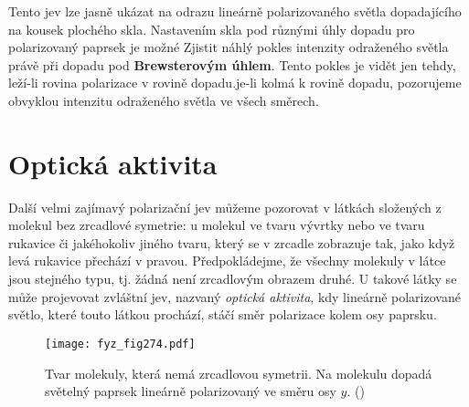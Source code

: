     Tento jev lze jasně ukázat na odrazu lineárně polarizovaného světla dopadajícího na kousek
    plochého skla. Nastavením skla pod různými úhly dopadu pro polarizovaný paprsek je možné Zjistit
    náhlý pokles intenzity odraženého světla právě při dopadu pod \textbf{Brewsterovým úhlem}. Tento
    pokles je vidět jen tehdy, leží-li rovina polarizace v rovině dopadu.je-li kolmá k rovině
    dopadu, pozorujeme obvyklou intenzitu odraženého světla ve všech směrech.

  \section{Optická aktivita}\label{fyz:IchapXXXIIIsecV}
    Další velmi zajímavý polarizační jev můžeme pozorovat v látkách složených z molekul bez
    zrcadlové symetrie: u molekul ve tvaru vývrtky nebo ve tvaru rukavice či jakéhokoliv jiného
    tvaru, který se v zrcadle zobrazuje tak, jako když levá rukavice přechází v pravou.
    Předpokládejme, že všechny molekuly v látce jsou stejného typu, tj. žádná není zrcadlovým
    obrazem druhé. U takové látky se může projevovat zvláštní jev, nazvaný \emph{optická aktivita},
    kdy lineárně polarizované světlo, které touto látkou prochází, stáčí směr polarizace kolem osy
    paprsku.
  
    \begin{figure}[ht!] %
      \centering
      \texttt{[image: fyz\_fig274.pdf]}
      \caption{Tvar molekuly, která nemá zrcadlovou symetrii. Na molekulu dopadá světelný paprsek
              lineárně polarizovaný ve směru osy \(y\). (\cite[s.~427]{Feynman01})}
      \label{fyz:fig274}
    \end{figure}

